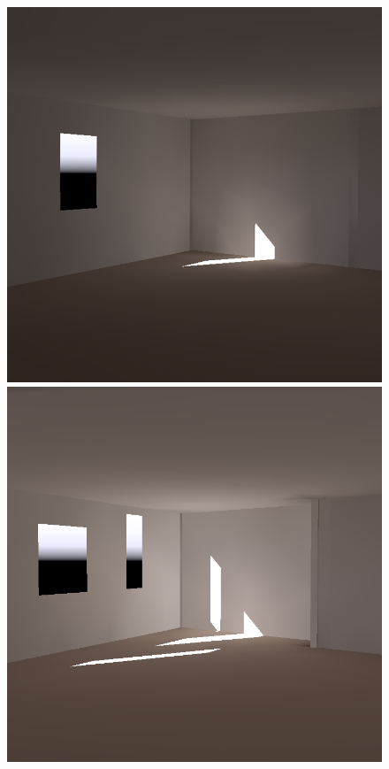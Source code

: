 \begin{figure}[t]
\includegraphics[width=\figwidth]{p3r_063_camera_chris_march.png}   %
\includegraphics[width=\figwidth]{p3r_063-2_camera_chris_march_mod.png}   %


\end{figure}
